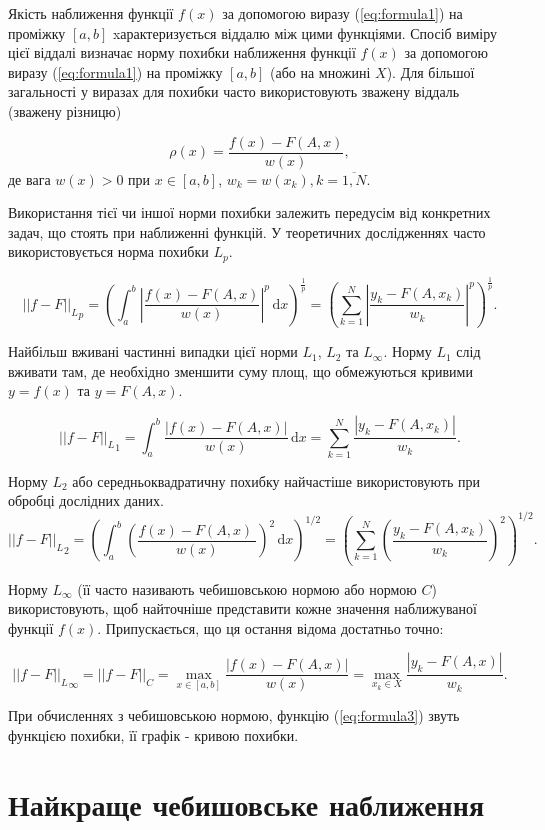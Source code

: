 \documentclass[ukrainian,14pt]{extarticle}
\begin{document}
Якість наближення функції $f(x)$ за допомогою виразу (\ref{eq:formula1}) на проміжку $[a,b]$ xарактеризується віддалю між цими функціями. Спосіб виміру цієї віддалі визначає норму похибки наближення функції $f(x)$ за допомогою виразу (\ref{eq:formula1}) на проміжку $[a,b]$ (або на множині $X$). Для більшої загальності у виразах для похибки часто використовують зважену віддаль (зважену різницю)

\begin{equation}\label{eq:formula3}
\rho(x) = \frac{f(x) - F(A, x)}{w(x)},
\end{equation}
де вага $w(x)>0$ при $x \in [a,b]$, $w_k=w(x_k), k=\overline{1,N}$.

Використання тієї чи іншої норми похибки залежить передусім від конкретних задач, що стоять при наближенні функцій. У теоретичних дослідженнях часто використовується норма похибки $L_p$.

$${||f-F||_L}_p = \left(\int_a^b \! \left|\frac{f(x) - F(A,x)}{w(x)}\right|^p \, \mathrm{d}x
 \right)^{\frac{1}{p}} = \left( \sum_{k=1}^N \left| \frac{y_k-F(A, x_k)}{w_k} \right|^p  \right)^{\frac{1}{p}}.$$

Найбільш вживані частинні випадки цієї норми $L_1$, $L_2$ та $L_\infty$.
Норму $L_1$ слід вживати там, де необхідно зменшити суму площ, що обмежуються кривими $y = f(x)$ та $y = F(A, x)$.

$${||f-F||_L}_1 = \int_a^b \! \frac{ \left| f(x) - F(A,x) \right| }{w(x)} \, \mathrm{d}x
  = \sum_{k=1}^N  \frac{ \left| y_k-F(A, x_k)  \right| }{w_k}.$$
 
 
Норму $L_2$ або середньоквадратичну похибку найчастіше використовують при обробці дослідних даних.
 $${||f-F||_L}_2 = \left(\int_a^b \! \left( \frac{f(x) - F(A,x) \ }{w(x)} \right)^{2} \, \mathrm{d}x
 \right)^{1/2} = \left( \sum_{k=1}^N  \left( \frac{  y_k-F(A, x_k)   }{w_k}\right)^{2}  \right)^{1/2}.$$
 
Норму $L_{\infty}$ (її часто називають чебишовською нормою або нормою $C$) використовують, щоб найточніше представити кожне значення наближуваної функції $f(x)$. Припускається, що ця остання відома достатньо точно:

$${||f-F||_L}_{\infty} = ||f-F||_C = \max_{x \in [a,b]} \frac{ \left| f(x) - F(A,x) \right| }{w(x)} = \max_{x_k \in X} \frac{ \left| y_k - F(A,x) \right| }{w_k}.$$

При обчисленнях з чебишовською нормою, функцію (\ref{eq:formula3}) звуть функцією похибки, її графік - кривою похибки.

\section{Найкраще чебишовське наближення}
\end{document}
